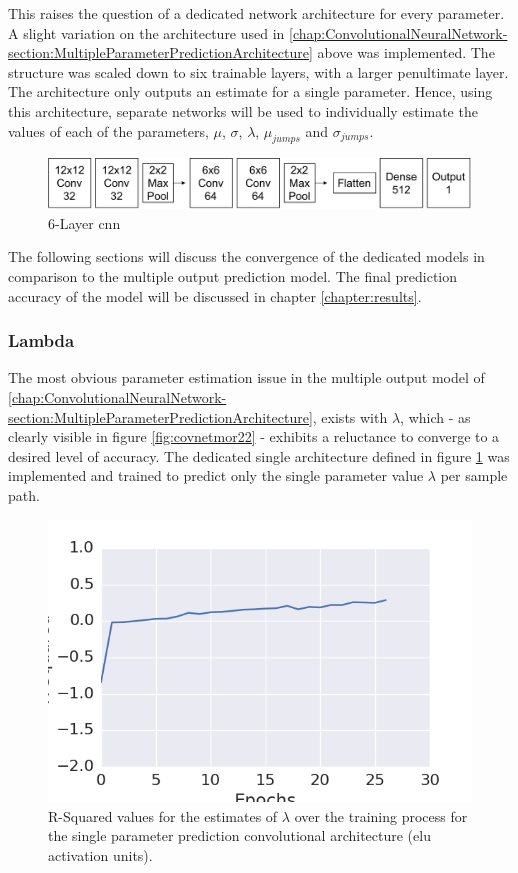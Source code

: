 \documentclass[11pt,oneside,openany,a4paper,english, report, goldenblock
]{usthesis}
\begin{document}
This raises the question of a dedicated network architecture for every parameter. A slight variation on the architecture used in \ref{chap:ConvolutionalNeuralNetwork-section:MultipleParameterPredictionArchitecture} above was implemented. The structure was scaled down to six trainable layers, with a larger penultimate layer. The architecture only outputs an estimate for a single parameter. Hence, using this architecture, separate networks will be used to individually estimate the values of each of the parameters, $\mu$, $\sigma$, $\lambda$, $\mu_{jumps}$ and $\sigma_{jumps}$.

\begin{figure}[h]
	\centering
	\includegraphics[width=0.75\linewidth]{Images/Diagrams/Network-Structures/SingleParameterDedicatedCNN}
	\caption[Dedicated Single Parameter Prediction \acrshort{cnn}]{6-Layer \acrshort{cnn}}
	\label{fig:singleparameterdedicatedcnn}
\end{figure}

The following sections will discuss the convergence of the dedicated models in comparison to the multiple output prediction model. The final prediction accuracy of the model will be discussed in chapter \ref{chapter:results}.

\subsubsection{Lambda}

The most obvious parameter estimation issue in the multiple output model of \ref{chap:ConvolutionalNeuralNetwork-section:MultipleParameterPredictionArchitecture}, exists with $\lambda$, which - as clearly visible in figure \ref{fig:covnetmor22} - exhibits a reluctance to converge to a desired level of accuracy. The dedicated single architecture defined in figure \ref{fig:singleparameterdedicatedcnn} was implemented and trained to predict only the single parameter value $\lambda$ per sample path. 

\begin{figure}[h]
	\centering
	\includegraphics[width=0.5\linewidth]{Images/Prediction-Convergence/ConvolutionalNN-SingleOutput/Lambda-RSquared}
	\caption[R-Squared values for the predictions of $\lambda$ over the training process for the single parameter prediction convolutional architecture (\acrshort{elu} activation units).]{R-Squared values for the estimates of $\lambda$ over the training process for the single parameter prediction convolutional architecture (\acrshort{elu} activation units).}
	\label{fig:lambda-rsquared}
\end{figure}
\end{document}
